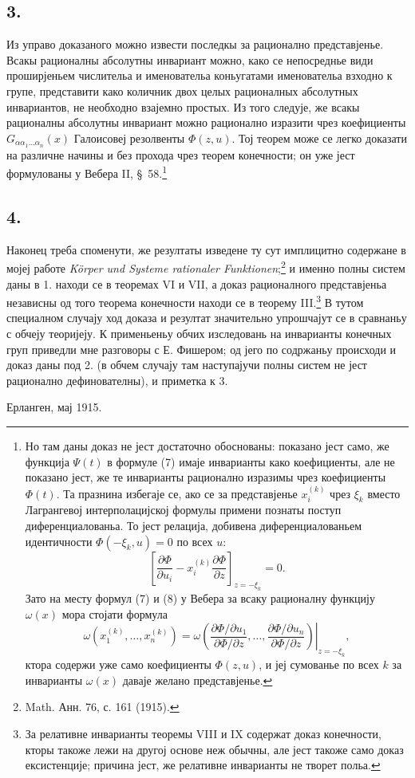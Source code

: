 ﻿\documentclass[11pt]{article}
\begin{document}
\subsection*{3.}
Из управо доказаного можно извести последкы за рационално представјенье. Всакы рационалны абсолутны инвариант можно, како се непосреднье види проширјеньем числительа и именовательа коньугатами именовательа взходно к групе, представити како количник двох целых рационалных абсолутных инвариантов, не необходно взајемно простых. Из того следује, же всакы рационалны абсолутны инвариант можно рационално изразити чрез коефициенты $G_{\alpha\alpha_1\ldots\alpha_n}(x)$ Галоисовеј резолвенты $\Phi(z,u)$. Тој теорем може се легко доказати на различне начины и без прохода чрез теорем конечности; он уже јест формулованы у Вебера II, \S\ 58.\footnote{Но там даны доказ не јест достаточно обоснованы: показано јест само, же функција $\Psi(t)$ в формуле (7) имаје инварианты како коефициенты, але не показано јест, же те инварианты рационално изразимы чрез коефициенты $\Phi(t)$. Та празнина избегаје се, ако се за представјенье $x_i^{(k)}$ чрез $\xi_k$ вместо Лагрангевој интерполацијској формулы примени познаты поступ диференциалованьа. То јест релација, добивена диференциалованьем идентичности $\Phi(-\xi_k,u)=0$ по всех $u$:
\[
 \left[\frac{\partial\Phi}{\partial u_i}
      -x_i^{(k)}\frac{\partial\Phi}{\partial z}\right]_{z=-\xi_k}=0.
\]
Зато на месту формул (7) и (8) у Вебера за всаку рационалну функцију $\omega(x)$ мора стојати формула
\[
 \omega(x_1^{(k)},\ldots,x_n^{(k)})=
 \left.
 \omega\!\left(
   \frac{\partial\Phi/\partial u_1}{\partial\Phi/\partial z},\ldots,
   \frac{\partial\Phi/\partial u_n}{\partial\Phi/\partial z}
 \right)\right|_{z=-\xi_k},
\]
ктора содержи уже само коефициенты $\Phi(z,u)$, и јеј сумованье по всех $k$ за инварианты $\omega(x)$ даваје желано представјенье.}

\subsection*{4.}
Наконец треба споменути, же резултаты изведене ту сут имплицитно содержане в мојеј работе \emph{Körper und Systeme rationaler Funktionen};\footnote{Math. Анн. 76, с. 161 (1915).} и именно полны систем даны в 1. находи се в теоремах VI и VII, а доказ рационалного представјеньа независны од того теорема конечности находи се в теорему III.\footnote{За релативне инварианты теоремы VIII и IX содержат доказ конечности, кторы такоже лежи на другој основе неж обычны, але јест такоже само доказ ексистенције; причина јест, же релативне инварианты не творет польа.} В тутом специалном случају ход доказа и резултат значительно упрошчајут се в сравнаньу с обчеју теоријеју. К применьеньу обчих изследовань на инварианты конечных груп приведли мне разговоры с Е. Фишером; од јего по содржаньу происходи и доказ даны под 2. (в обчем случају там наступајучи полны систем не јест рационално дефинователны), и приметка к 3.

Ерланген, мај 1915.
\end{document}
